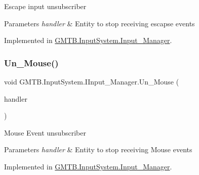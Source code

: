 Escape input unsubscriber 


\begin{DoxyParams}{Parameters}
{\em handler} & Entity to stop receiving escapse events\\
\hline
\end{DoxyParams}


Implemented in \mbox{\hyperlink{class_g_m_t_b_1_1_input_system_1_1_input___manager_a949303424f450dabf798922c7868c9e7}{G\+M\+T\+B.\+Input\+System.\+Input\+\_\+\+Manager}}.

\mbox{\label{interface_g_m_t_b_1_1_input_system_1_1_i_input___manager_aef09d69d61e15351f0eabd51b61157c3}} 
\subsubsection{\texorpdfstring{Un\_Mouse()}{Un\_Mouse()}}
{\footnotesize\ttfamily void G\+M\+T\+B.\+Input\+System.\+I\+Input\+\_\+\+Manager.\+Un\+\_\+\+Mouse (\begin{DoxyParamCaption}\item[{Event\+Handler$<$ \mbox{\hyperlink{class_g_m_t_b_1_1_input_system_1_1_mouse_event}{Mouse\+Event}} $>$}]{handler }\end{DoxyParamCaption})}



Mouse Event unsubscriber 


\begin{DoxyParams}{Parameters}
{\em handler} & Entity to stop receiving Mouse events \\
\hline
\end{DoxyParams}


Implemented in \mbox{\hyperlink{class_g_m_t_b_1_1_input_system_1_1_input___manager_a7f3fda3da96c231d003ec39a4e884832}{G\+M\+T\+B.\+Input\+System.\+Input\+\_\+\+Manager}}.

\mbox{\label{interface_g_m_t_b_1_1_input_system_1_1_i_input___manager_a7b2ca99e2877562ead23aa209162f08b}} 
